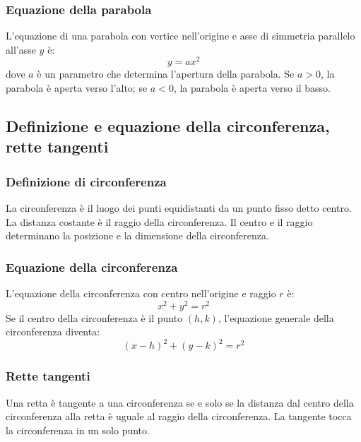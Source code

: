 \documentclass{article}
\begin{document}
\subsubsection{Equazione della parabola}
L'equazione di una parabola con vertice nell'origine e asse di simmetria parallelo all'asse
\(y\) è:
\[
    y = ax^2
\]
dove \(a\) è un parametro che determina l'apertura della parabola. Se \(a > 0\), la parabola
è aperta verso l'alto; se \(a < 0\), la parabola è aperta verso il basso.


\newpage
\subsection{Definizione e equazione della circonferenza, rette tangenti}

\subsubsection{Definizione di circonferenza}
La circonferenza è il luogo dei punti equidistanti da un punto fisso detto centro. La distanza
costante è il raggio della circonferenza. Il centro e il raggio determinano la posizione e la
dimensione della circonferenza.

\subsubsection{Equazione della circonferenza}
L'equazione della circonferenza con centro nell'origine e raggio \(r\) è:
\[
    x^2 + y^2 = r^2
\]
Se il centro della circonferenza è il punto \((h, k)\), l'equazione generale della
circonferenza diventa:
\[
    (x - h)^2 + (y - k)^2 = r^2
\]


\subsubsection{Rette tangenti}
Una retta è tangente a una circonferenza se e solo se la distanza dal centro della
circonferenza alla retta è uguale al raggio della circonferenza. La tangente tocca la
circonferenza in un solo punto.
\end{document}
